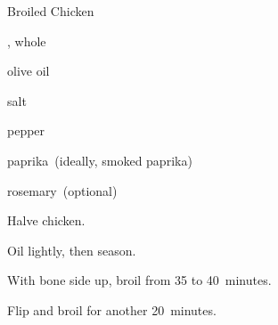 \begin{recipe}{Broiled Chicken}{}{}

\begin{ingredients}
\item {}, whole
\item olive oil
\item salt
\item pepper
\item paprika~(ideally, smoked paprika)
\item rosemary~(optional)
\end{ingredients}

\begin{directions}
\item Halve chicken.
\item Oil lightly, then season.
\item With bone side up, broil from 35 to 40~minutes.
\item Flip and broil for another 20~minutes.
\end{directions}

\end{recipe}
